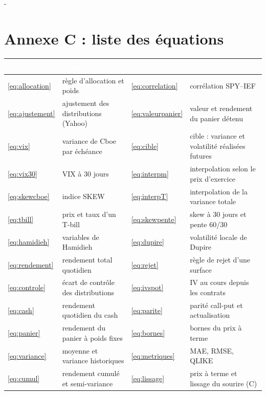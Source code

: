 \documentclass[10pt,a4paper]{article}
\makeatletter
\newcommand{\entete}[1]{\textcolor{white}{\bfseries #1}}
\newcommand{\besoin}[1]{\par\penalty-100\begingroup\setlength{\dimen@}{#1}%
  \dimen@ii\pagegoal\advance\dimen@ii-\pagetotal
  \ifdim\dimen@>\dimen@ii\ifdim\dimen@ii>\z@\vfil\fi\break\fi\endgroup}
\let\sectionorigine\section
\renewcommand{\section}{\besoin{6\baselineskip}\sectionorigine}
\makeatother
\begin{document}
\section{Annexe C : liste des équations}\label{sec:equations}
{\small
\begin{longtable}{@{}L{0.9cm} L{7.45cm} L{0.9cm} L{7.45cm}@{}}
\entete{N\textsuperscript{o}} & \entete{Nom} & \entete{N\textsuperscript{o}} & \entete{Nom} \\
\endhead
\eqref{eq:allocation} & règle d'allocation et poids & \eqref{eq:correlation} & corrélation SPY–IEF \\
\eqref{eq:ajustement} & ajustement des distributions (Yahoo) & \eqref{eq:valeurpanier} & valeur et rendement du panier détenu \\
\eqref{eq:vix} & variance de Cboe par échéance & \eqref{eq:cible} & cible : variance et volatilité réalisées futures \\
\eqref{eq:vix30} & VIX à 30 jours & \eqref{eq:interpm} & interpolation selon le prix d'exercice \\
\eqref{eq:skewcboe} & indice SKEW & \eqref{eq:interpT} & interpolation de la variance totale \\
\eqref{eq:tbill} & prix et taux d'un T-bill & \eqref{eq:skewpente} & skew à 30 jours et pente 60/30 \\
\eqref{eq:hamidieh} & variables de Hamidieh & \eqref{eq:dupire} & volatilité locale de Dupire \\
\eqref{eq:rendement} & rendement total quotidien & \eqref{eq:rejet} & règle de rejet d'une surface \\
\eqref{eq:controle} & écart de contrôle des distributions & \eqref{eq:ivspot} & IV au cours depuis les contrats \\
\eqref{eq:cash} & rendement quotidien du cash & \eqref{eq:parite} & parité call-put et actualisation \\
\eqref{eq:panier} & rendement du panier à poids fixes & \eqref{eq:bornes} & bornes du prix à terme \\
\eqref{eq:variance} & moyenne et variance historiques & \eqref{eq:metriques} & MAE, RMSE, QLIKE \\
\eqref{eq:cumul} & rendement cumulé et semi-variance & \eqref{eq:lissage} & prix à terme et lissage du sourire (C) \\
\end{longtable}}
\end{document}
